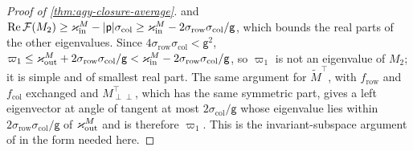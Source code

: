 \begin{proof}[Proof of \cref{thm:agy-closure-average}]
and $\operatorname{Re}\mathcal F(M_2)\ge\varkappa_{\mathrm{in}}^M-\lvert\mathsf p\rvert\sigma_{\mathrm{col}}\ge\varkappa_{\mathrm{in}}^M-2\sigma_{\mathrm{row}}\sigma_{\mathrm{col}}/\mathsf g$, which bounds the real parts of the other eigenvalues. Since $4\sigma_{\mathrm{row}}\sigma_{\mathrm{col}}<\mathsf g^2$, $\varpi_1\le\varkappa_{\mathrm{out}}^M+2\sigma_{\mathrm{row}}\sigma_{\mathrm{col}}/\mathsf g<\varkappa_{\mathrm{in}}^M-2\sigma_{\mathrm{row}}\sigma_{\mathrm{col}}/\mathsf g$, so $\varpi_1$ is not an eigenvalue of $M_2$; it is simple and of smallest real part. The same argument for $\tilde M^\top$, with $f_{\mathrm{row}}$ and $f_{\mathrm{col}}$ exchanged and $M_{\perp\perp}^\top$, which has the same symmetric part, gives a left eigenvector at angle of tangent at most $2\sigma_{\mathrm{col}}/\mathsf g$ whose eigenvalue lies within $2\sigma_{\mathrm{row}}\sigma_{\mathrm{col}}/\mathsf g$ of $\varkappa_{\mathrm{out}}^M$ and is therefore $\varpi_1$. This is the invariant-subspace argument of \citet{stewart1973error} in the form needed here.


\end{proof}
